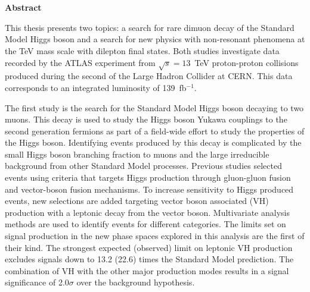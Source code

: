 \phantom{x}\\
\phantom{x}\\
\vspace{1.1em}

\begin{center}
\textbf{\LARGE Abstract}
\end{center} 

This thesis presents two topics: a search for rare dimuon decay of the Standard Model Higgs boson and a search for new physics with non-resonant phenomena at the TeV mass scale with dilepton final states.
Both studies investigate data recorded by the ATLAS experiment from $\sqrt{s}=13$~TeV proton-proton collisions produced during the second of the Large Hadron Collider at CERN.
This data corresponds to an integrated luminosity of 139~fb$^{-1}$. 

The first study is the search for the Standard Model Higgs boson decaying to two muons.
This decay is used to study the Higgs boson Yukawa couplings to the second generation fermions as part of a field-wide effort to study the properties of the Higgs boson.
Identifying events produced by this decay is complicated by the small Higgs boson branching fraction to muons and the large irreducible background from other Standard Model processes.
Previous studies selected events using criteria that targets Higgs production through gluon-gluon fusion and vector-boson fusion mechanisms.
To increase sensitivity to Higgs produced events, new selections are added targeting vector boson associated (VH) production with a leptonic decay from the vector boson.
Multivariate analysis methods are used to identify events for different categories.
The limits set on signal production in the new phase spaces explored in this analysis are the first of their kind.
The strongest expected (observed) limit on leptonic VH production excludes signals down to 13.2 (22.6) times the Standard Model prediction.
The combination of VH with the other major production modes results in a signal significance of 2.0$\sigma$ over the background hypothesis.

